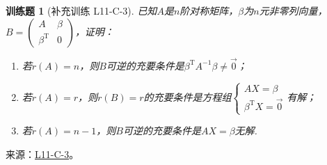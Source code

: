 \documentclass[UTF8,12pt,a4paper,fontset=fandol]{ctexart}
\newtheorem{exercise}{训练题}[section]
\begin{document}
\begin{exercise}[补充训练 L11-C-3]\label{prob:L11-C-3}
已知$A$是$n$阶对称矩阵，$\beta$为$n$元非零列向量，$B=\begin{pmatrix}
                A & \beta \\ \beta^\mathrm{T} & 0
            \end{pmatrix}$，证明：
        \begin{enumerate}
            \item 若$r(A)=n$，则$B$可逆的充要条件是$\beta^\mathrm{T}A^{-1}\beta \neq \vec{0}$；

            \item 若$r(A)=r$，则$r(B)=r$的充要条件是方程组$\begin{cases}
                          AX=\beta \\ \beta^\mathrm{T}X=\vec{0}
                      \end{cases}$有解；

            \item 若$r(A)=n-1$，则$B$可逆的充要条件是$AX=\beta$无解.
        \end{enumerate}
\end{exercise}
\noindent 来源：\href{https://github.com/yhwu-is/Linear-Algebra-Left-Undone/blob/new/%E8%AE%B2%E4%B9%89/%E4%B8%93%E9%A2%98/11%20%E6%9C%9D%E8%8A%B1%E5%A4%95%E6%8B%BE.tex}{L11-C-3}。
\end{document}
